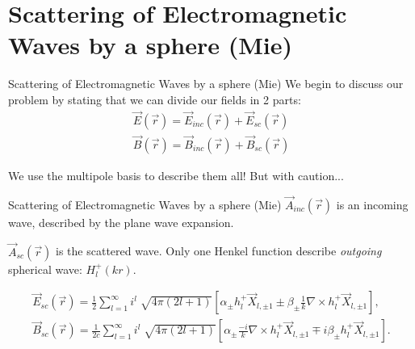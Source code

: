 \documentclass[10pt]{beamer}
\begin{document}

\section{Scattering of Electromagnetic Waves by a sphere (Mie)}


\begin{frame}[fragile]{Scattering of Electromagnetic Waves by a sphere (Mie)}
We begin to discuss our problem by stating that we can divide our fields in 2 parts:
      \begin{equation*}
      \begin{split}
          \vec{E}(\vec{r}) = \vec{E}_{inc}(\vec{r}) + \vec{E}_{sc}(\vec{r})\\
          \vec{B}(\vec{r}) = \vec{B}_{inc}(\vec{r}) + \vec{B}_{sc}(\vec{r})
      \end{split}
      \end{equation*}

      We use the multipole basis to describe them all! But with caution...

\end{frame}


\begin{frame}[fragile]{Scattering of Electromagnetic Waves by a sphere (Mie)}
$\vec{A}_{inc}(\vec{r})$ is an incoming wave, described by the plane wave expansion.

$\vec{A}_{sc}(\vec{r})$ is the scattered wave. Only one Henkel function describe \emph{outgoing} spherical wave: $H_l^+(kr)$.

      \begin{equation*}
      \begin{split}
          \vec{E}_{sc}(\vec{r})=\frac{1}{2}\sum_{l=1}^{\infty}i^l\sqrt[]{4\pi(2l+1)}\left[\alpha _{\pm}h^+_l\vec{X}_{l,\pm1} \pm \beta_{\pm}\frac{1}{k}\nabla \times h^+_l\vec{X}_{l,\pm1}\right],\\
          \vec{B}_{sc}(\vec{r})=\frac{1}{2c}\sum_{l=1}^{\infty}i^l\sqrt[]{4\pi(2l+1)}\left[\alpha_{\pm}\frac{-i}{k}\nabla \times h^+_l\vec{X}_{l,\pm1} \mp i\beta_{\pm}h^+_l\vec{X}_{l,\pm1}\right].     
          \end{split}
      \end{equation*}

\end{frame}
\end{document}
